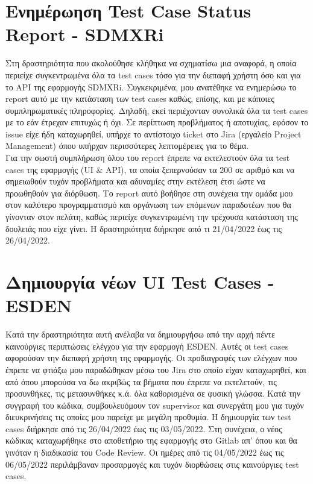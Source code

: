 \section {Ενημέρωηση Test Case Status Report - SDMXRi}
Στη δραστηριότητα που ακολούθησε κλήθηκα να σχηματίσω μια αναφορά, η οποία περιείχε συγκεντρωμένα όλα τα test cases τόσο για την διεπαφή χρήστη 
όσο και για το ΑΡΙ της εφαρμογής SDMXRi. Συγκεκριμένα, μου ανατέθηκε να ενημερώσω το report αυτό με την κατάσταση των test cases καθώς, επίσης, και 
με κάποιες συμπληρωματικές πληροφορίες. Δηλαδή, εκεί περιέχονταν συνολικά όλα τα test cases με το εάν έτρεχαν επιτυχώς ή όχι. Σε περίπτωση 
προβλήματος ή αποτυχίας, εφόσον το issue είχε ήδη καταχωρηθεί, υπήρχε το αντίστοιχο ticket στο Jira (εργαλείο Project Management) όπου υπήρχαν περισσότερες λεπτομέρειες για το θέμα. \\

Για την σωστή συμπλήρωση όλου του report έπρεπε να εκτελεστούν όλα τα test cases της εφαρμογής (UI \& API), τα οποία ξεπερνούσαν τα 200 σε αριθμό και να σημειωθούν τυχόν 
προβλήματα και αδυναμίες στην εκτέλεση έτσι ώστε να προωθηθούν για διόρθωση. Το report αυτό βοήθησε στη συνέχεια την ομάδα μου στον καλύτερο προγραμματισμό και οργάνωση 
των επόμενων παραδοτέων που θα γίνονταν στον πελάτη, καθώς περιείχε συγκεντρωμένη την τρέχουσα κατάσταση της δουλειάς που είχε γίνει. Η δραστηριότητα διήρκησε από τι 21/04/2022 έως τις 26/04/2022.

\section {Δημιουργία νέων UI Test Cases - ESDEN}
Κατά την δραστηριότητα αυτή ανέλαβα να δημιουργήσω από την αρχή πέντε καινούργιες περιπτώσεις ελέγχου για την εφαρμογή ESDEN. Αυτές οι test cases 
αφορούσαν την διεπαφή χρήστη της εφαρμογής. Οι προδιαγραφές των ελέγχων που έπρεπε να φτιάξω μου παραδώθηκαν μέσω του Jira στο οποίο είχαν καταχωρηθεί,  
και από όπου μπορούσα να δω ακριβώς τα βήματα που έπρεπε να εκτελετούν, τις προσυνθήκες, τις μετασυνθήκες κ.ά. όλα καθορισμένα σε φυσική γλώσσα. 
Κατά την συγγραφή του κώδικα, συμβουλευόμουν τον supervisor και συνεργάτη μου για τυχόν διευκρινήσεις τις οποίες μου παρείχε με μεγάλη προθυμία. 
Η δημιουργία των test cases διήρκησε από τις 26/04/2022 έως τις 03/05/2022. Στη συνέχεια, ο νέος κώδικας καταχωρήθηκε στο αποθετήριο της εφαρμογής 
στο Gitlab απ' όπου και θα γινόταν η διαδικασία του Code Review. Οι ημέρες από τις 04/05/2022 έως τις 06/05/2022 περιλάμβαναν προσαρμογές και τυχόν 
διορθώσεις στις καινούργιες test cases.

